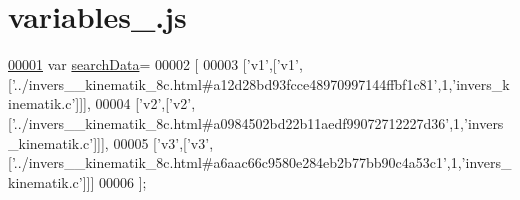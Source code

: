 \hypertarget{variables__15_8js_source}{}\section{variables\+\_.\+js}
\label{variables__15_8js_source}

\begin{DoxyCode}
\hypertarget{variables__15_8js_source.tex_l00001}{}\hyperlink{variables__15_8js_ad01a7523f103d6242ef9b0451861231e}{00001} var \hyperlink{variables__15_8js_ad01a7523f103d6242ef9b0451861231e}{searchData}=
00002 [
00003   [\textcolor{stringliteral}{'v1'},[\textcolor{stringliteral}{'v1'},[\textcolor{stringliteral}{'../invers\_\_kinematik\_8c.html#a12d28bd93fcce48970997144ffbf1c81'},1,\textcolor{stringliteral}{'invers\_kinematik.c'}]]],
00004   [\textcolor{stringliteral}{'v2'},[\textcolor{stringliteral}{'v2'},[\textcolor{stringliteral}{'../invers\_\_kinematik\_8c.html#a0984502bd22b11aedf99072712227d36'},1,\textcolor{stringliteral}{'invers\_kinematik.c'}]]],
00005   [\textcolor{stringliteral}{'v3'},[\textcolor{stringliteral}{'v3'},[\textcolor{stringliteral}{'../invers\_\_kinematik\_8c.html#a6aac66c9580e284eb2b77bb90c4a53c1'},1,\textcolor{stringliteral}{'invers\_kinematik.c'}]]]
00006 ];
\end{DoxyCode}
